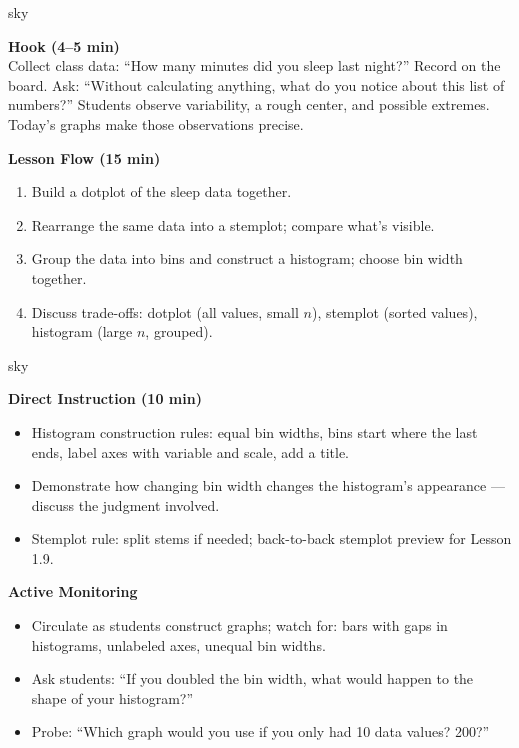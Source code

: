 \documentclass[10pt]{article}
\begin{document}
\begin{skillbox}{sky}
\begin{minipage}[t]{0.48\linewidth}
    \textbf{Hook (4--5 min)}\\
    Collect class data: ``How many minutes did you sleep last night?'' Record on the board. Ask: ``Without calculating anything, what do you notice about this list of numbers?'' Students observe variability, a rough center, and possible extremes. Today's graphs make those observations precise.
\end{minipage}
\hfill
\begin{minipage}[t]{0.48\linewidth}
    \textbf{Lesson Flow (15 min)}
    \begin{enumerate}
        \item Build a dotplot of the sleep data together.
        \item Rearrange the same data into a stemplot; compare what's visible.
        \item Group the data into bins and construct a histogram; choose bin width together.
        \item Discuss trade-offs: dotplot (all values, small $n$), stemplot (sorted values), histogram (large $n$, grouped).
    \end{enumerate}
\end{minipage}
\end{skillbox}

\begin{skillbox}{sky}
\begin{minipage}[t]{0.48\linewidth}
    \textbf{Direct Instruction (10 min)}
    \begin{itemize}
        \item Histogram construction rules: equal bin widths, bins start where the last ends, label axes with variable and scale, add a title.
        \item Demonstrate how changing bin width changes the histogram's appearance --- discuss the judgment involved.
        \item Stemplot rule: split stems if needed; back-to-back stemplot preview for Lesson 1.9.
    \end{itemize}
\end{minipage}
\hfill
\begin{minipage}[t]{0.48\linewidth}
    \textbf{Active Monitoring}
    \begin{itemize}
        \item Circulate as students construct graphs; watch for: bars with gaps in histograms, unlabeled axes, unequal bin widths.
        \item Ask students: ``If you doubled the bin width, what would happen to the shape of your histogram?''
        \item Probe: ``Which graph would you use if you only had 10 data values? 200?''
    \end{itemize}
\end{minipage}
\end{skillbox}
\end{document}
